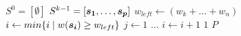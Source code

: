 \begin{algorithmic}[1]
    \State $S^0 = [\emptyset ]$
      \State $S^{k-1} = [\boldsymbol{s_1}, \ldots, \boldsymbol{s_p}]$
      \State $w_{left} \gets (w_{k} + \ldots + w_n)$
      \State $i \gets min\{i \;| \; w(\boldsymbol{s_i}) \geq w_{left}\}$
      \State $j \gets 1$
        \State $\ldots$
        \State $i \gets i + 1$
      \EndWhile
      \State $1$
    \EndFor
  \State \Return $P$
  \EndFunction
\end{algorithmic}
